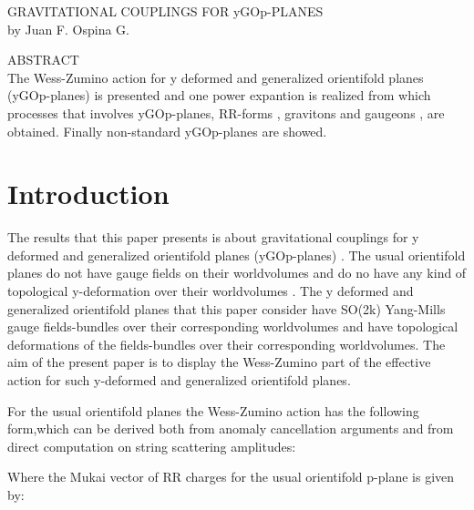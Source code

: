 \documentclass[a4paper,a4paper]{article}
\begin{document}
\begin{center}
GRAVITATIONAL COUPLINGS FOR yGOp-PLANES  \\ [.25in]
by Juan F. Ospina G.
\end{center}
\begin{center}
ABSTRACT \\ [.25in]
The Wess-Zumino action for y deformed and generalized orientifold planes (yGOp-planes)  is presented and  one power expantion is realized from which processes that involves yGOp-planes, RR-forms , gravitons and gaugeons , are obtained. Finally non-standard yGOp-planes  are showed.
\end{center}

\section{Introduction}
The results that this paper presents is about gravitational couplings for y deformed and generalized orientifold planes (yGOp-planes) . The usual orientifold planes do not have gauge fields on their worldvolumes and do no have any kind of topological y-deformation over their worldvolumes . The y deformed and generalized orientifold planes that this paper consider have SO(2k) Yang-Mills gauge fields-bundles over their corresponding worldvolumes and have topological deformations of the fields-bundles over their corresponding worldvolumes. The aim of the present paper is to display the Wess-Zumino part of the effective action for such y-deformed and  generalized orientifold planes.



For the usual orientifold planes the Wess-Zumino action has the following form,which can be derived both from anomaly cancellation arguments and from
direct computation on string scattering amplitudes:   

\begin{center}
{  \coordHE{} }
\end{center}

Where the Mukai vector of RR charges for the usual orientifold p-plane is given by:
\end{document}
